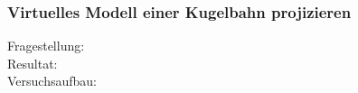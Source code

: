 \subsubsection{Virtuelles Modell einer Kugelbahn projizieren}
\begin{description}
	\item[Fragestellung:] 
	\item[Resultat:] %
	\item[Versuchsaufbau:] 

\end{description}
